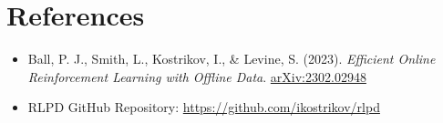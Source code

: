 \documentclass[12pt]{article}
\begin{document}
\appendix
\section{References}
\begin{itemize}
    \item Ball, P. J., Smith, L., Kostrikov, I., \& Levine, S. (2023). \textit{Efficient Online Reinforcement Learning with Offline Data}. \href{https://arxiv.org/abs/2302.02948}{arXiv:2302.02948}
    \item RLPD GitHub Repository: \href{https://github.com/ikostrikov/rlpd}{https://github.com/ikostrikov/rlpd}
\end{itemize}
\end{document}
